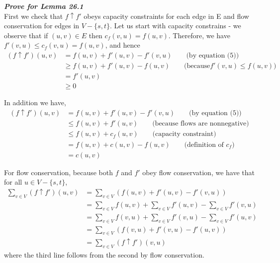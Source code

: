 \textbf{\textit{Prove for Lemma 26.1}}\\
First we check that $f \uparrow f'$ obeys capacity constraints for each edge in E and flow conservation for edges in $V-\{s, t\}$. Let us start with capacity constrains - we observe that if $(u, v) \in E$ then $c_f(v, u) = f(u, v)$. Therefore, we have $f'(v, u) \leq c_f(v, u) = f(u, v)$, and hence 
\begin{align*}
(f \uparrow f')(u, v) &= f(u, v) + f'(u, v) - f'(v, u) \qquad \text{(by equation (5))}\\
&\geq f(u, v) + f'(u, v) - f(u, v) \qquad \text{(because} f'(v, u) \leq f(u, v))\\
&= f'(u, v)\\
&\geq 0 
\end{align*}

In addition we have, 
\begin{align*}
(f \uparrow f')(u, v) &= f(u, v) + f'(u, v) - f'(v, u) \qquad \text{(by equation (5))}\\
&\leq f(u, v) + f'(u, v) \qquad \text{(because flows are nonnegative)}\\
&\leq f(u, v) + c_f(u, v) \qquad \text{(capacity constraint)}\\
&= f(u, v) + c(u, v) - f(u, v) \qquad \text{(definition of } c_f)\\
&= c(u, v) 
\end{align*}

For flow conservation, because both $f$ and $f'$ obey flow conservation, we have that for all $u \in V - \{s, t\}$,
\begin{align*}
\sum_{v \in V} (f \uparrow f')(u, v) &= \sum_{v \in V} (f(u, v) + f'(u, v) - f'(v, u))\\
&= \sum_{v \in V} f(u, v) + \sum_{v \in V} f'(u, v) - \sum_{v \in V} f'(v, u)\\
&= \sum_{v \in V} f(v, u) + \sum_{v \in V} f'(v, u) - \sum_{v \in V} f'(u, v)\\
&= \sum_{v \in V} (f(v, u) + f'(v, u) - f'(u, v))\\
&= \sum_{v \in V} (f \uparrow f')(v, u)
\end{align*}
where the third line follows from the second by flow conservation. \\

